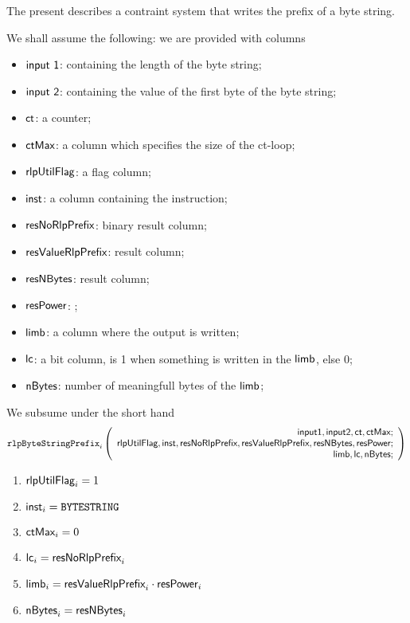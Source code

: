 The present describes a contraint system that writes the \rlp{} prefix of a byte string.

We shall assume the following: we are provided with columns
\begin{itemize}
    \item $\textsf{input 1}$: containing the length of the byte string;
    \item $\textsf{input 2}$: containing the value of the first byte of the byte string;
    \item $\textsf{ct}$: a counter;
    \item $\textsf{ctMax}$: a column which specifies the size of the ct-loop;

    \item $\textsf{rlpUtilFlag}$: a flag column;
    \item $\textsf{inst}$: a column containing the instruction;
    \item $\textsf{resNoRlpPrefix}$: binary result column;
    \item $\textsf{resValueRlpPrefix}$: result column;
    \item $\textsf{resNBytes}$: result column;
    \item $\textsf{resPower}$: ;

    \item $\textsf{limb}$: a column where the output is written;
    \item $\textsf{lc}$: a bit column, is 1 when something is written in the $\textsf{limb}$, else 0;
    \item $\textsf{nBytes}$: number of meaningfull bytes of the $\textsf{limb}$;
\end{itemize}

\noindent We subsume under the short hand
\[
    \texttt{rlpByteStringPrefix}_{i}
    \left(
	\begin{array}{r}
    \textsf{input1},
    \textsf{input2},
    \textsf{ct},
    \textsf{ctMax}; \\
    \textsf{rlpUtilFlag},
    \textsf{inst},
    \textsf{resNoRlpPrefix},
    \textsf{resValueRlpPrefix},
    \textsf{resNBytes},
    \textsf{resPower}; \\
    \textsf{limb},
    \textsf{lc},
    \textsf{nBytes}; \\
    \end{array}
	\right)
\]

\begin{enumerate}
    \item $\textsf{rlpUtilFlag}_{i} = 1$
    \item $\textsf{inst}_{i} = \texttt{BYTESTRING}$
    \item $\textsf{ctMax}_{i} = 0$

    \item $\textsf{lc}_{i} = \textsf{resNoRlpPrefix}_{i}$
    \item $\textsf{limb}_{i} = \textsf{resValueRlpPrefix}_{i} \cdot \textsf{resPower}_{i}$
    \item $\textsf{nBytes}_{i} = \textsf{resNBytes}_{i}$
\end{enumerate}
